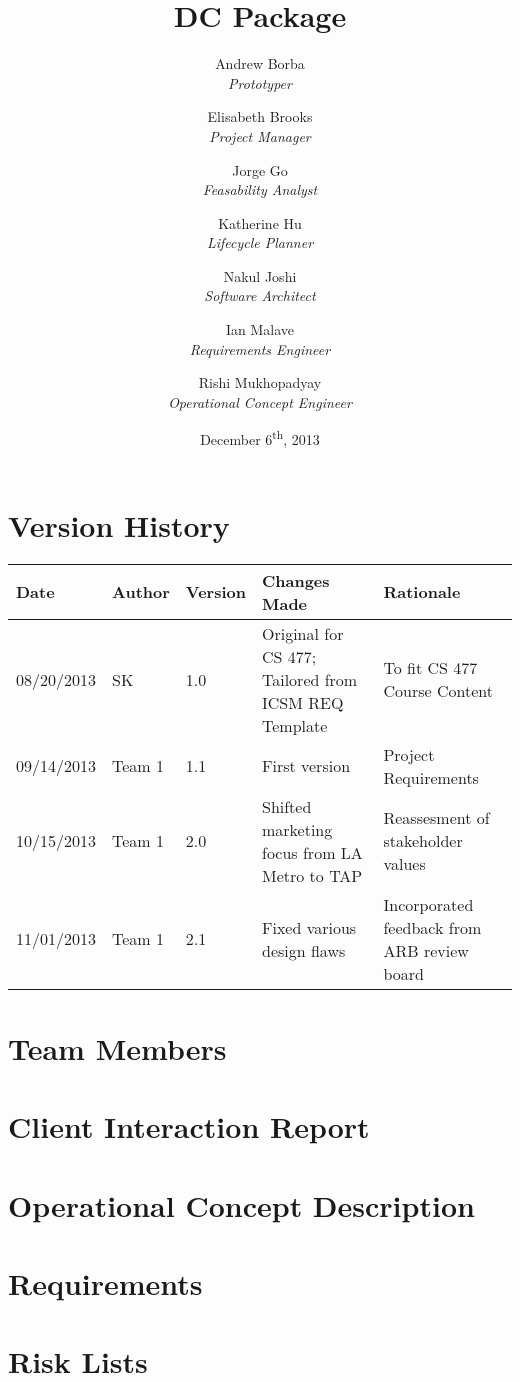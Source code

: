 \documentclass[titlepage]{article}
\title{DC Package}
\author{
	Andrew Borba\\ \emph{Prototyper}	\and
	 Elisabeth Brooks\\ \emph{Project Manager}	\and
	 Jorge Go\\ \emph{Feasability Analyst}	\and
	 Katherine Hu\\ \emph{Lifecycle Planner}	\and
	 Nakul Joshi\\ \emph{Software Architect}	\and
	 Ian Malave\\ \emph{Requirements Engineer}	\and
	 Rishi Mukhopadyay\\ \emph{Operational Concept Engineer}
}
\date{December 6\textsuperscript{th}, 2013}
\begin{document}
\pagestyle{fancy}
\chead{}
\lfoot{}
\cfoot{\thepage}
\rfoot{}

\maketitle
\tableofcontents
\newpage
\section{Version History}
\begin{table}[h]
	\centering
	\begin{tabularx}{\textwidth}{lllXX}
		\hline
		Date		& Author	& Version	& Changes Made											& Rationale                    \\ \hline
		08/20/2013	& SK		& 1.0		& Original for CS 477; Tailored from ICSM REQ Template	& To fit CS 477 Course Content \\ 
		09/14/2013	& Team 1	& 1.1 		& First version											& Project Requirements			\\
		10/15/2013	& Team 1	& 2.0 		& Shifted marketing focus from LA Metro to TAP			& Reassesment of stakeholder values\\
		11/01/2013	& Team 1	& 2.1		& Fixed various design flaws											& Incorporated feedback from ARB review board
	\end{tabularx}
\end{table}
\newpage

\section{Team Members}

\newpage

\section{Client Interaction Report}

\newpage

\section{Operational Concept Description}

\newpage

\section{Requirements}

\newpage

\section{Risk Lists}

		
\end{document}
